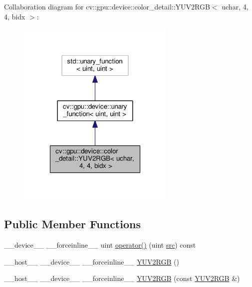 Collaboration diagram for cv\-:\-:gpu\-:\-:device\-:\-:color\-\_\-detail\-:\-:Y\-U\-V2\-R\-G\-B$<$ uchar, 4, 4, bidx $>$\-:\nopagebreak
\begin{figure}[H]
\begin{center}
\leavevmode
\includegraphics[width=214pt]{structcv_1_1gpu_1_1device_1_1color__detail_1_1YUV2RGB_3_01uchar_00_014_00_014_00_01bidx_01_4__coll__graph}
\end{center}
\end{figure}
\subsection*{Public Member Functions}
\begin{DoxyCompactItemize}
\item 
\-\_\-\-\_\-device\-\_\-\-\_\- \-\_\-\-\_\-forceinline\-\_\-\-\_\- uint \hyperlink{structcv_1_1gpu_1_1device_1_1color__detail_1_1YUV2RGB_3_01uchar_00_014_00_014_00_01bidx_01_4_aa287ede2553898adeb8d51b14e8a6994}{operator()} (uint \hyperlink{legacy_8hpp_a371cd109b74033bc4366f584edd3dacc}{src}) const 
\item 
\-\_\-\-\_\-host\-\_\-\-\_\- \-\_\-\-\_\-device\-\_\-\-\_\- \-\_\-\-\_\-forceinline\-\_\-\-\_\- \hyperlink{structcv_1_1gpu_1_1device_1_1color__detail_1_1YUV2RGB_3_01uchar_00_014_00_014_00_01bidx_01_4_a74cadd5811b8ae0307a2938e3e7a36e0}{Y\-U\-V2\-R\-G\-B} ()
\item 
\-\_\-\-\_\-host\-\_\-\-\_\- \-\_\-\-\_\-device\-\_\-\-\_\- \-\_\-\-\_\-forceinline\-\_\-\-\_\- \hyperlink{structcv_1_1gpu_1_1device_1_1color__detail_1_1YUV2RGB_3_01uchar_00_014_00_014_00_01bidx_01_4_ae120041586bb060c6631350bd5594110}{Y\-U\-V2\-R\-G\-B} (const \hyperlink{structcv_1_1gpu_1_1device_1_1color__detail_1_1YUV2RGB}{Y\-U\-V2\-R\-G\-B} \&)
\end{DoxyCompactItemize}


